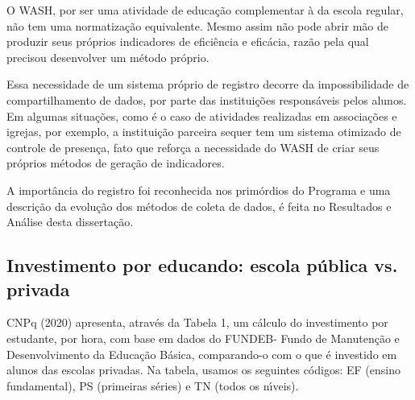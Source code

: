 \documentclass[
12pt,		%
openright,	%
twoside,  %
a4paper,			%
chapter=TITLE,		%
english,			%
french,				%
spanish,			%
brazil				%
]{USPSC-classe/USPSC}
\begin{document}
O WASH, por ser uma atividade de educa\c{c}\~ao complementar \`a da escola regular, n\~ao tem uma normatiza\c{c}\~ao equivalente. Mesmo assim n\~ao pode abrir m\~ao de produzir seus pr\'oprios indicadores de efici\^encia e efic\'acia, raz\~ao pela qual precisou desenvolver um m\'etodo pr\'oprio.

















Essa necessidade de um sistema pr\'oprio de registro decorre da impossibilidade de compartilhamento de dados, por parte das institui\c{c}\~oes respons\'aveis pelos alunos. Em algumas situa\c{c}\~oes, como \'e o caso de atividades realizadas em associa\c{c}\~oes e igrejas, por exemplo, a institui\c{c}\~ao parceira sequer tem um sistema otimizado de controle de presen\c{c}a, fato que refor\c{c}a a necessidade do WASH de criar seus pr\'oprios m\'etodos de gera\c{c}\~ao de indicadores.

















A import\^ancia do registro foi reconhecida nos prim\'ordios do Programa e uma descri\c{c}\~ao da evolu\c{c}\~ao dos m\'etodos de coleta de dados, \'e feita no Resultados e An\'alise desta disserta\c{c}\~ao.

















\subsection[Investimento por educando: escola p\'ublica vs. privada]{Investimento por educando: escola p\'ublica vs. privada}\label{Investimento por educando: escola p\'ublica vs. privada}
CNPq (2020)  apresenta, atrav\'es da Tabela 1, um c\'alculo do investimento por estudante, por hora, com base em dados do FUNDEB- Fundo de Manuten\c{c}\~ao e Desenvolvimento da Educa\c{c}\~ao B\'asica, comparando-o com o que \'e investido em alunos das escolas privadas. Na tabela, usamos os seguintes c\'odigos: EF (ensino fundamental), PS (primeiras s\'eries) e TN (todos os n\'{\i}veis).
\end{document}
